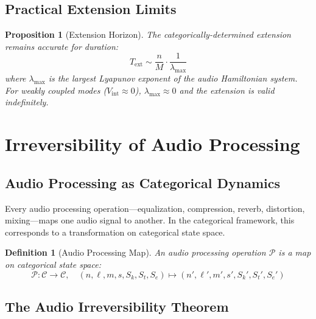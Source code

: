 \documentclass[twocolumn,10pt]{article}
\newtheorem{proposition}[theorem]{Proposition}
\newtheorem{definition}[theorem]{Definition}
\theoremstyle{remark}
\newcommand{\Sk}{S_k}
\newcommand{\St}{S_t}
\newcommand{\Se}{S_e}
\newcommand{\calC}{\mathcal{C}}
\newcommand{\calP}{\mathcal{P}}
\begin{document}
\subsection{Practical Extension Limits}

\begin{proposition}[Extension Horizon]
\label{prop:extension_horizon}
The categorically-determined extension remains accurate for duration:
\begin{equation}
    T_{\mathrm{ext}} \sim \frac{n}{M} \cdot \frac{1}{\lambda_{\max}}
    \label{eq:extension_horizon}
\end{equation}
where $\lambda_{\max}$ is the largest Lyapunov exponent of the audio Hamiltonian system. For weakly coupled modes ($V_{\mathrm{int}} \approx 0$), $\lambda_{\max} \approx 0$ and the extension is valid indefinitely.
\end{proposition}


\section{Irreversibility of Audio Processing}
\label{sec:irreversibility}

\subsection{Audio Processing as Categorical Dynamics}

Every audio processing operation---equalization, compression, reverb, distortion, mixing---maps one audio signal to another. In the categorical framework, this corresponds to a transformation on categorical state space.

\begin{definition}[Audio Processing Map]
\label{def:processing_map}
An audio processing operation $\calP$ is a map on categorical state space:
\begin{equation}
    \calP: \calC \to \calC, \quad (n, \ell, m, s, \Sk, \St, \Se) \mapsto (n', \ell', m', s', \Sk', \St', \Se')
    \label{eq:processing_map}
\end{equation}
\end{definition}

\subsection{The Audio Irreversibility Theorem}
\end{document}
